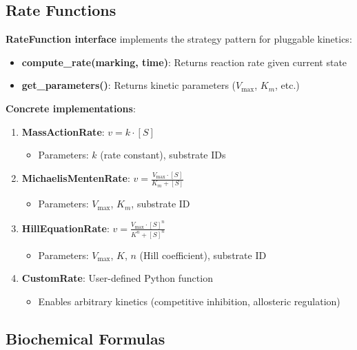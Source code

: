\subsection{Rate Functions}
\label{subsec:rate-functions}

\textbf{RateFunction interface} implements the strategy pattern for pluggable kinetics:

\begin{itemize}
    \item \textbf{compute\_rate(marking, time)}: Returns reaction rate given current state
    \item \textbf{get\_parameters()}: Returns kinetic parameters ($V_{\max}$, $K_m$, etc.)
\end{itemize}

\textbf{Concrete implementations}:

\begin{enumerate}
    \item \textbf{MassActionRate}: $v = k \cdot [S]$
    \begin{itemize}
        \item Parameters: $k$ (rate constant), substrate IDs
    \end{itemize}
    
    \item \textbf{MichaelisMentenRate}: $v = \frac{V_{\max} \cdot [S]}{K_m + [S]}$
    \begin{itemize}
        \item Parameters: $V_{\max}$, $K_m$, substrate ID
    \end{itemize}
    
    \item \textbf{HillEquationRate}: $v = \frac{V_{\max} \cdot [S]^n}{K^n + [S]^n}$
    \begin{itemize}
        \item Parameters: $V_{\max}$, $K$, $n$ (Hill coefficient), substrate ID
    \end{itemize}
    
    \item \textbf{CustomRate}: User-defined Python function
    \begin{itemize}
        \item Enables arbitrary kinetics (competitive inhibition, allosteric regulation)
    \end{itemize}
\end{enumerate}

\subsection{Biochemical Formulas}
\label{subsec:biochemical-formulas}

